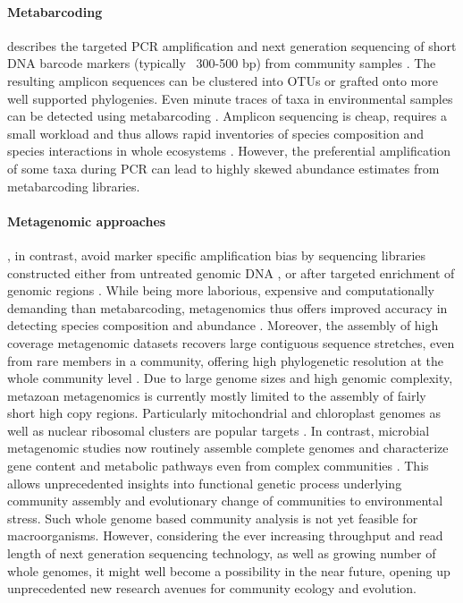 \documentclass[12pt]{article}
\begin{document}
\paragraph{Metabarcoding} describes the targeted PCR amplification and
next generation sequencing of short DNA barcode markers (typically
~300-500 bp) from community samples \citep{Yu2012, ji2013}. The
resulting amplicon sequences can be clustered into OTUs or grafted
onto more well supported phylogenies. Even minute traces of taxa in
environmental samples can be detected using metabarcoding
\citep{bohmann2014}.  Amplicon sequencing is cheap, requires a small
workload and thus allows rapid inventories of species composition and
species interactions in whole ecosystems \citep{gibson2014, leray2015,
  pompanon2012}. However, the preferential amplification of some taxa
during PCR can lead to highly skewed abundance estimates
\citep{Yu2012, elbrecht2015} from metabarcoding libraries.

\paragraph{Metagenomic approaches}, in contrast, avoid marker specific
amplification bias by sequencing libraries constructed either from
untreated genomic DNA \citep{dodsworth2015, linard2015, tang2014}, or
after targeted enrichment of genomic regions \citep{liu2016}. While
being more laborious, expensive and computationally demanding than
metabarcoding, metagenomics thus offers improved accuracy in detecting
species composition and abundance \citep{zhou2013}. Moreover, the
assembly of high coverage metagenomic datasets recovers large
contiguous sequence stretches, even from rare members in a community,
offering high phylogenetic resolution at the whole community level
\citep{coissac2016}. Due to large genome sizes and high genomic
complexity, metazoan metagenomics is currently mostly limited to the
assembly of fairly short high copy regions. Particularly mitochondrial
and chloroplast genomes as well as nuclear ribosomal clusters are
popular targets \citep{dodsworth2015, coissac2016}. In contrast,
microbial metagenomic studies now routinely assemble complete genomes
and characterize gene content and metabolic pathways even from complex
communities \citep{nielsen2014}. This allows unprecedented insights
into functional genetic process underlying community assembly and
evolutionary change of communities to environmental stress.  Such
whole genome based community analysis is not yet feasible for
macroorganisms. However, considering the ever increasing throughput
and read length of next generation sequencing technology, as well as
growing number of whole genomes, it might well become a possibility in
the near future, opening up unprecedented new research avenues for
community ecology and evolution.
\end{document}
